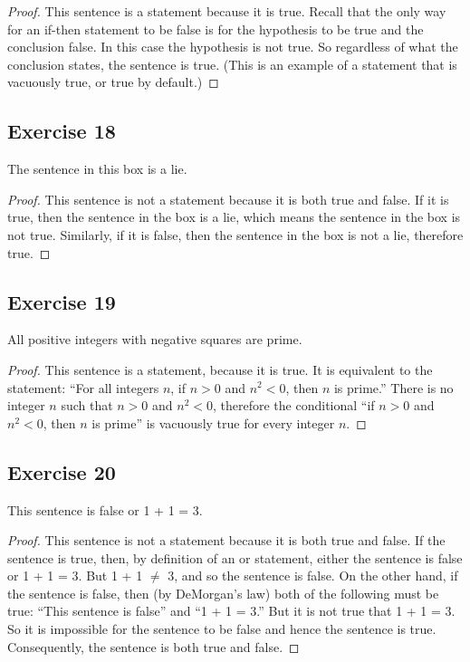 \documentclass[14pt]{extarticle}
\begin{document}
\begin{proof}
  This sentence is a statement because it is true. Recall that the only way for an if-then statement to be false is
  for the hypothesis to be true and the conclusion false. In this case the hypothesis is not true. So regardless of what
  the conclusion states, the sentence is true. (This is an example of a statement that is vacuously true, or true by
  default.)
\end{proof}

\subsection{Exercise 18}
\begin{tcolorbox}[colframe=black]
  The sentence in this box is a lie.
\end{tcolorbox}

\begin{proof}
  This sentence is not a statement because it is both true and false. If it is true, then the sentence in the box is a
  lie, which means the sentence in the box is not true. Similarly, if it is false, then the sentence in the box is
  not a lie, therefore true.
\end{proof}

\subsection{Exercise 19}
All positive integers with negative squares are prime.

\begin{proof}
  This sentence is a statement, because it is true. It is equivalent to the statement: ``For all integers $n$, if
  $n > 0$ and $n^2 < 0$, then $n$ is prime.'' There is no integer $n$ such that $n > 0$ and $n^2 < 0$, therefore the
  conditional ``if $n > 0$ and $n^2 < 0$, then $n$ is prime'' is vacuously true for every integer $n$.
\end{proof}

\subsection{Exercise 20}
This sentence is false or 1 + 1 = 3.

\begin{proof}
  This sentence is not a statement because it is both true and false. If the sentence is true, then, by definition of
  an or statement, either the sentence is false or 1 + 1 = 3. But 1 + 1 $\neq$ 3, and so the sentence is false. On the
  other hand, if the sentence is false, then (by DeMorgan’s law) both of the following must be true: “This sentence is
  false” and “1 + 1 = 3.” But it is not true that 1 + 1 = 3. So it is impossible for the sentence to be false and hence
  the sentence is true. Consequently, the sentence is both true and false.
\end{proof}
\end{document}
